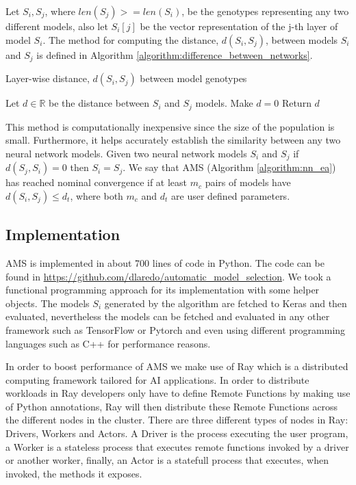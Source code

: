 \documentclass[journal]{IEEEtran}
\begin{document}
Let $S_i, S_j$, where $len(S_j) >= len(S_i)$, be the genotypes representing any two different models, also let $S_i[j]$ be the vector representation of the j-th layer of model $S_i$. The method for computing the distance, $d(S_i, S_j)$, between models $S_i$ and $S_j$ is defined in Algorithm \ref{algorithm:difference_between_networks}.\\

\begin{algorithm}[!htb]
\caption{Layer-wise distance, $d(S_i, S_j)$ between model genotypes}
\begin{algorithmic}[0]
\State Let $d \in \mathbb{R}$ be the distance between $S_i$ and $S_j$ models. Make $d = 0$
\EndFor
{}
\EndFor
\State Return $d$
\end{algorithmic}
\label{algorithm:difference_between_networks}
\end{algorithm}

This method is computationally inexpensive since the size of the population is small. Furthermore, it helps accurately establish the similarity between any two neural network models. Given two neural network models $S_i$ and $S_j$ if $d(S_j, S_i) = 0$ then $S_i = S_j$. We say that AMS (Algorithm \ref{algorithm:nn_ea}) has reached nominal convergence if at least $m_c$ pairs of models have $d(S_i, S_j) \leq d_t$, where both $m_c$ and $d_t$ are user defined parameters.

\subsection{Implementation}
\label{sec:implementation}

AMS is implemented in about 700 lines of code in Python. The code can be found in \url{https://github.com/dlaredo/automatic_model_selection}. We took a functional programming approach for its implementation with some helper objects. The models $S_i$ generated by the algorithm are fetched to Keras \cite{keras2015} and then evaluated, nevertheless the models can be fetched and evaluated in any other framework such as TensorFlow or Pytorch and even using different programming languages such as C++ for performance reasons.

In order to boost performance of AMS we make use of Ray \cite{Moritz2017} which is a distributed computing framework tailored for AI applications. In order to distribute workloads in Ray developers only have to define Remote Functions by making use of Python annotations, Ray will then distribute these Remote Functions across the different nodes in the cluster. There are three different types of nodes in Ray: Drivers, Workers and Actors. A Driver is the process executing the user program, a Worker is a stateless process that executes remote functions invoked by a driver or another worker, finally, an Actor is a statefull process that executes, when invoked, the methods it exposes.
\end{document}
